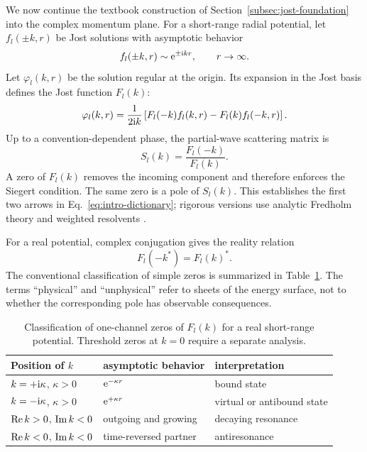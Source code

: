 We now continue the textbook construction of
Section~\ref{subsec:jost-foundation} into the complex momentum plane.  For a
short-range radial potential, let $f_l(\pm k,r)$ be Jost solutions with
asymptotic behavior
\begin{equation}
  f_l(\pm k,r)\sim\mathrm{e}^{\pm\mathrm{i} kr},
  \qquad r\to\infty .
  \label{eq:jost-asymptotic}
\end{equation}
Let $\varphi_l(k,r)$ be the solution regular at the origin.  Its expansion in
the Jost basis defines the Jost function $F_l(k)$:
\begin{equation}
  \varphi_l(k,r)
  =\frac{1}{2\mathrm{i} k}
  \left[F_l(-k)f_l(k,r)-F_l(k)f_l(-k,r)\right] .
  \label{eq:regular-jost-expansion}
\end{equation}
Up to a convention-dependent phase, the partial-wave scattering matrix is
\begin{equation}
  S_l(k)=\frac{F_l(-k)}{F_l(k)} .
  \label{eq:S-jost}
\end{equation}
A zero of $F_l(k)$ removes the incoming component and therefore enforces the
Siegert condition.  The same zero is a pole of $S_l(k)$.  This establishes the
first two arrows in Eq.~\eqref{eq:intro-dictionary}; rigorous versions use
analytic Fredholm theory and weighted resolvents
\cite{Newton:1960,Taylor:1972,Sasakawa:1991,Rakityansky:2022Jost}.

For a real potential, complex conjugation gives the reality relation
\begin{equation}
  F_l(-k^*)=F_l(k)^* .
  \label{eq:jost-reality}
\end{equation}
The conventional classification of simple zeros is summarized in
Table~\ref{tab:jost-zero-classification}.  The terms ``physical'' and
``unphysical'' refer to sheets of the energy surface, not to whether the
corresponding pole has observable consequences.

\begin{table}[t]
  \centering
  \begin{tabular}{lll}
    \toprule
    Position of $k$ & asymptotic behavior & interpretation \\
    \midrule
    $k=+\mathrm{i}\kappa$, $\kappa>0$ & $\mathrm{e}^{-\kappa r}$
      & bound state \\
\addlinespace
    $k=-\mathrm{i}\kappa$, $\kappa>0$ & $\mathrm{e}^{+\kappa r}$
      & virtual or antibound state \\
\addlinespace
    $\operatorname{Re} k>0$, $\operatorname{Im} k<0$ & outgoing and growing
      & decaying resonance \\
\addlinespace
    $\operatorname{Re} k<0$, $\operatorname{Im} k<0$ & time-reversed partner
      & antiresonance \\
    \bottomrule
  \end{tabular}
  \caption{Classification of one-channel zeros of $F_l(k)$ for a real
  short-range potential.  Threshold zeros at $k=0$ require a separate
  analysis.}
  \label{tab:jost-zero-classification}
\end{table}

